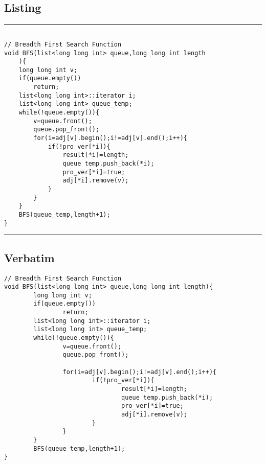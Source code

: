 \documentclass{article}
\begin{document}
        \subsection{Listing}
        \vspace{.5cm}
        \rule{5in}{.5pt}
        \begin{lstlisting}[columns=fullflexible]
        
// Breadth First Search Function
void BFS(list<long long int> queue,long long int length 
    ){
    long long int v;
    if(queue.empty())
        return;
    list<long long int>::iterator i;
    list<long long int> queue_temp;
    while(!queue.empty()){
        v=queue.front();
        queue.pop_front();
        for(i=adj[v].begin();i!=adj[v].end();i++){
            if(!pro_ver[*i]){
                result[*i]=length;
                queue temp.push_back(*i);
                pro_ver[*i]=true;
                adj[*i].remove(v);
            } 
        }
    }
    BFS(queue_temp,length+1); 
}
        \end{lstlisting}
        \vspace{.5cm}
        \rule{5in}{.5pt}
        \newpage
        
        
        \subsection{Verbatim}
        \begin{verbatim}
// Breadth First Search Function
void BFS(list<long long int> queue,long long int length){
        long long int v;
        if(queue.empty())
                return;
        list<long long int>::iterator i;
        list<long long int> queue_temp;
        while(!queue.empty()){
                v=queue.front();
                queue.pop_front();
                
                for(i=adj[v].begin();i!=adj[v].end();i++){
                        if(!pro_ver[*i]){
                                result[*i]=length;
                                queue temp.push_back(*i);
                                pro_ver[*i]=true;
                                adj[*i].remove(v);
                        } 
                }
        }
        BFS(queue_temp,length+1); 
}
        \end{verbatim}
        
        \newpage
        
\end{document}
